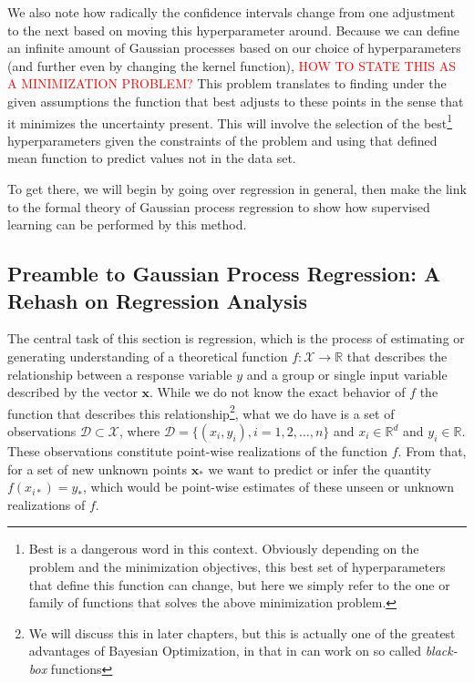 We also note how radically the confidence intervals change from one adjustment to the next based on moving this hyperparameter around. Because we can define an infinite amount of Gaussian processes based on our choice of hyperparameters (and further even by changing the kernel function), \textcolor{red}{HOW TO STATE THIS AS A MINIMIZATION PROBLEM?}
This problem translates to finding under the given assumptions the function that best adjusts to these points in the sense that it minimizes the uncertainty present. This will involve the selection of the best\footnote{Best is a dangerous word in this context. Obviously depending on the problem and the minimization objectives, this best set of hyperparameters that define this function can change, but here we simply refer to the one or family of functions that solves the above minimization problem.} hyperparameters given the constraints of the problem and using that defined mean function to predict values not in the data set.

To get there, we will begin by going over regression in general, then make the link to the formal theory of Gaussian process regression to show how supervised learning can be performed by this method. 

\subsection{Preamble to Gaussian Process Regression: A Rehash on Regression Analysis}

The central task of this section is regression, which is the process of estimating or generating understanding of a theoretical function $f: \mathcal{X} \rightarrow \mathbb{R}$ that describes the relationship between a response variable $y$ and a group or single input variable described by the vector $\boldsymbol{x}$. While we do not know the exact behavior of $f$ the function that describes this relationship\footnote{We will discuss this in later chapters, but this is actually one of the greatest advantages of Bayesian Optimization, in that in can work on so called \textit{black-box} functions}, what we do have is a set of observations $\mathcal{D} \subset \mathcal{X}$, where $\mathcal{D} = \{ (x_i, y_i), i = 1,2,\ldots, n \}$ and $x_i \in \mathbb{R}^d$ and $y_i \in \mathbb{R}$. These observations constitute point-wise realizations of the function $f$. From that, for a set of new unknown points $\boldsymbol{x}_*$ we want to predict or infer the quantity $f(x_{i*}) = y_*$, which would be point-wise estimates of these unseen or unknown realizations of $f$. 

